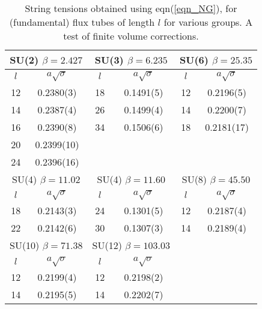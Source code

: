 \documentclass[12pt]{article}
\begin{document}
\clearpage

\begin{table}[htb]
\centering
\begin{tabular}{|cc|cc|cc|} \hline
  \multicolumn{2}{|c|}{SU(2) $\beta=2.427$} & \multicolumn{2}{|c|}{SU(3) $\beta=6.235$}
   & \multicolumn{2}{|c|}{SU(6) $\beta=25.35$} \\ \hline
  $l$ & $a\surd\sigma$ & $l$ & $a\surd\sigma$ & $l$ & $a\surd\sigma$ \\ \hline
12   & 0.2380(3)  & 18  & 0.1491(5)  & 12  & 0.2196(5)    \\
14   & 0.2387(4)  & 26  & 0.1499(4)  & 14  & 0.2200(7)    \\
16   & 0.2390(8)  & 34  & 0.1506(6)  & 18  & 0.2181(17)    \\
20   & 0.2399(10) &     &   &     &     \\
24   & 0.2396(16) &     &   &     &     \\ \hline
  \multicolumn{2}{|c|}{SU(4) $\beta=11.02$} & \multicolumn{2}{|c|}{SU(4) $\beta=11.60$}
   & \multicolumn{2}{|c|}{SU(8) $\beta=45.50$} \\ \hline
  $l$ & $a\surd\sigma$ & $l$ & $a\surd\sigma$ & $l$ & $a\surd\sigma$ \\ \hline
 18  & 0.2143(3)  & 24  & 0.1301(5)  & 12  &  0.2187(4)   \\
 22  & 0.2142(6)  & 30  & 0.1307(3)  & 14  &  0.2189(4)   \\ \hline
  \multicolumn{2}{|c|}{SU(10) $\beta=71.38$} & \multicolumn{2}{|c|}{SU(12) $\beta=103.03$}
   &  \multicolumn{2}{|c|}{}  \\ \hline
   $l$ & $a\surd\sigma$ & $l$ & $a\surd\sigma$ &  & \\ \hline
 12  & 0.2199(4)  & 12  & 0.2198(2)  &   &     \\
 14  & 0.2195(5)  & 14  & 0.2202(7)  &   &     \\ \hline
\end{tabular}
\caption{String tensions obtained using eqn(\ref{eqn_NG}), for  (fundamental) flux tubes
  of length $l$ for various groups. A test of finite volume corrections.}
\label{table_V_k1_SUN}
\end{table}
\end{document}
